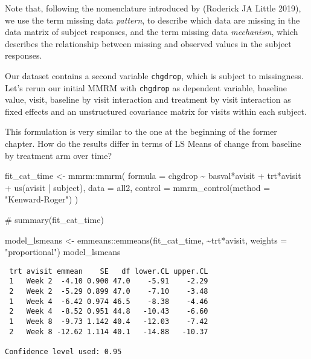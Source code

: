 \documentclass[
  letterpaper,
  DIV=11,
  numbers=noendperiod]{scrreprt}
\newenvironment{Shaded}{\begin{snugshade}}{\end{snugshade}}
\newcommand{\AttributeTok}[1]{\textcolor[rgb]{0.40,0.45,0.13}{#1}}
\newcommand{\CommentTok}[1]{\textcolor[rgb]{0.37,0.37,0.37}{#1}}
\newcommand{\FunctionTok}[1]{\textcolor[rgb]{0.28,0.35,0.67}{#1}}
\newcommand{\NormalTok}[1]{\textcolor[rgb]{0.00,0.23,0.31}{#1}}
\newcommand{\OtherTok}[1]{\textcolor[rgb]{0.00,0.23,0.31}{#1}}
\newcommand{\SpecialCharTok}[1]{\textcolor[rgb]{0.37,0.37,0.37}{#1}}
\newcommand{\StringTok}[1]{\textcolor[rgb]{0.13,0.47,0.30}{#1}}
\begin{document}
Note that, following the nomenclature introduced by (Roderick JA Little
2019), we use the term missing data \emph{pattern}, to describe which
data are missing in the data matrix of subject responses, and the term
missing data \emph{mechanism}, which describes the relationship between
missing and observed values in the subject responses.

Our dataset contains a second variable \texttt{chgdrop}, which is
subject to missingness. Let's rerun our initial MMRM with
\texttt{chgdrop} as dependent variable, baseline value, visit, baseline
by visit interaction and treatment by visit interaction as fixed effects
and an unstructured covariance matrix for visits within each subject.

This formulation is very similar to the one at the beginning of the
former chapter. How do the results differ in terms of LS Means of change
from baseline by treatment arm over time?

\begin{Shaded}
\begin{Highlighting}[]
\NormalTok{fit\_cat\_time }\OtherTok{\textless{}{-}}\NormalTok{ mmrm}\SpecialCharTok{::}\FunctionTok{mmrm}\NormalTok{(}
  \AttributeTok{formula =}\NormalTok{ chgdrop }\SpecialCharTok{\textasciitilde{}}\NormalTok{ basval}\SpecialCharTok{*}\NormalTok{avisit }\SpecialCharTok{+}\NormalTok{ trt}\SpecialCharTok{*}\NormalTok{avisit }\SpecialCharTok{+} \FunctionTok{us}\NormalTok{(avisit }\SpecialCharTok{|}\NormalTok{ subject),}
  \AttributeTok{data =}\NormalTok{ all2,}
  \AttributeTok{control =} \FunctionTok{mmrm\_control}\NormalTok{(}\AttributeTok{method =} \StringTok{"Kenward{-}Roger"}\NormalTok{)}
\NormalTok{)}

\CommentTok{\# summary(fit\_cat\_time)}

\NormalTok{model\_lsmeans }\OtherTok{\textless{}{-}}\NormalTok{ emmeans}\SpecialCharTok{::}\FunctionTok{emmeans}\NormalTok{(fit\_cat\_time, }\SpecialCharTok{\textasciitilde{}}\NormalTok{trt}\SpecialCharTok{*}\NormalTok{avisit, }\AttributeTok{weights =} \StringTok{"proportional"}\NormalTok{)}
\NormalTok{model\_lsmeans}
\end{Highlighting}
\end{Shaded}

\begin{verbatim}
 trt avisit emmean    SE   df lower.CL upper.CL
 1   Week 2  -4.10 0.900 47.0    -5.91    -2.29
 2   Week 2  -5.29 0.899 47.0    -7.10    -3.48
 1   Week 4  -6.42 0.974 46.5    -8.38    -4.46
 2   Week 4  -8.52 0.951 44.8   -10.43    -6.60
 1   Week 8  -9.73 1.142 40.4   -12.03    -7.42
 2   Week 8 -12.62 1.114 40.1   -14.88   -10.37

Confidence level used: 0.95 
\end{verbatim}
\end{document}
